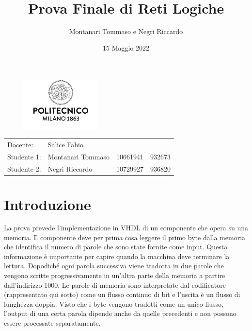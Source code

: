 \documentclass{article}
\title{Prova Finale di Reti Logiche} %
\author{Montanari Tommaso e Negri Riccardo} %
\date{15 Maggio 2022}
\begin{document}
\maketitle %
\begin{figure}[H]
	\centering
	\includegraphics[width=0.365\textwidth]{assets/logo.jpg}
\end{figure}
\begin{center}

\begin{tabular}{l l l l}
Docente: & Salice Fabio & & \\ 
Studente 1: & Montanari Tommaso & 10661941 & 932673\\
Studente 2: & Negri Riccardo & 10729927 & 936820 
\end{tabular}
\end{center}

\tableofcontents
\pagebreak


\section{Introduzione}

La prova prevede l'implementazione in VHDL di un componente che opera su una memoria. Il componente deve per prima cosa leggere il primo byte dalla memoria che identifica il numero di parole che sono
state fornite come input. Questa informazione è importante per capire quando la macchina deve terminare la lettura. Dopodiché ogni parola successiva viene tradotta in due parole che vengono scritte progressivamente in un'altra parte della memoria a partire dall'indirizzo 1000. Le parole di memoria sono interpretate dal codificatore (rappresentato qui sotto) come un flusso continuo di bit e l'uscita è un flusso di lunghezza doppia. Visto che i byte vengono tradotti come un unico flusso, l'output di una certa parola dipende anche da quelle precedenti e non possono essere processate separatamente.
\end{document}
